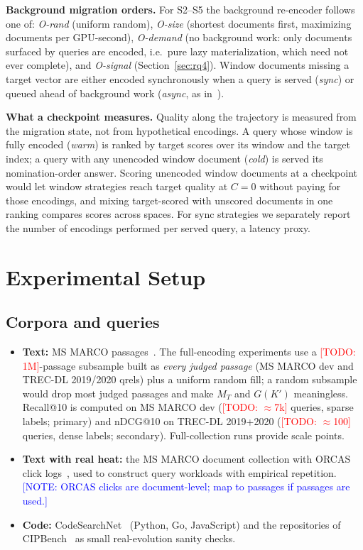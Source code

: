 \documentclass[conference]{IEEEtran}
\newcommand{\todo}[1]{\textcolor{red}{[TODO: #1]}}
\newcommand{\note}[1]{\textcolor{blue}{[NOTE: #1]}}
\begin{document}
\textbf{Background migration orders.} For S2--S5 the background re-encoder follows one
of: \emph{O-rand} (uniform random), \emph{O-size} (shortest documents first, maximizing
documents per GPU-second), \emph{O-demand} (no background work: only documents surfaced
by queries are encoded, i.e.\ pure lazy materialization, which need not ever complete),
and \emph{O-signal} (Section~\ref{sec:rq4}). Window documents missing a target vector are
either encoded synchronously when a query is served (\emph{sync}) or queued ahead of
background work (\emph{async}, as in~\cite{embedflow}).

\textbf{What a checkpoint measures.} Quality along the trajectory is measured from the
migration state, not from hypothetical encodings. A query whose window is fully encoded
(\emph{warm}) is ranked by target scores over its window and the target index; a query
with any unencoded window document (\emph{cold}) is served its nomination-order answer.
Scoring unencoded window documents at a checkpoint would let window strategies reach
target quality at $C{=}0$ without paying for those encodings, and mixing target-scored
with unscored documents in one ranking compares scores across spaces. For sync strategies
we separately report the number of encodings performed per served query, a latency proxy.

\section{Experimental Setup}\label{sec:setup}

\subsection{Corpora and queries}
\begin{itemize}
\item \textbf{Text:} MS MARCO passages~\cite{msmarco}. The full-encoding experiments use
a \todo{1M}-passage subsample built as \emph{every judged passage} (MS MARCO dev and
TREC-DL 2019/2020 qrels) plus a uniform random fill; a random subsample would drop most
judged passages and make $M_T$ and $G(K')$ meaningless. Recall@10 is computed on MS MARCO
dev (\todo{$\approx$7k} queries, sparse labels; primary) and nDCG@10 on TREC-DL 2019+2020
(\todo{$\approx$100} queries, dense labels; secondary). Full-collection runs provide scale points.
\item \textbf{Text with real heat:} the MS MARCO document collection with ORCAS click
logs~\cite{orcas}, used to construct query workloads with empirical repetition.
\note{ORCAS clicks are document-level; map to passages if passages are used.}
\item \textbf{Code:} CodeSearchNet~\cite{codesearchnet} (Python, Go, JavaScript) and the
repositories of CIPBench~\cite{cipbench} as small real-evolution sanity checks.
\end{itemize}
\end{document}
